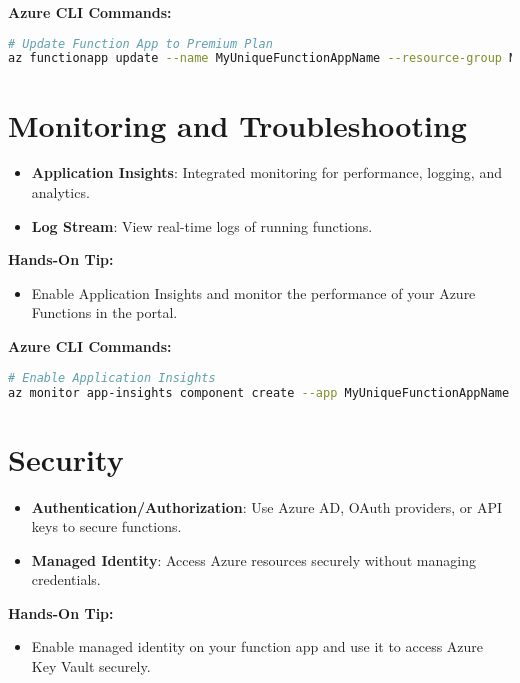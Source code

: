 \documentclass{article}
\begin{document}
\textbf{Azure CLI Commands:}
\begin{lstlisting}[language=bash]
# Update Function App to Premium Plan
az functionapp update --name MyUniqueFunctionAppName --resource-group MyResourceGroup --plan MyPremiumPlan
\end{lstlisting}

\section{Monitoring and Troubleshooting}
\begin{itemize}
    \item \textbf{Application Insights}: Integrated monitoring for performance, logging, and analytics.
    \item \textbf{Log Stream}: View real-time logs of running functions.
\end{itemize}

\textbf{Hands-On Tip:}
\begin{itemize}
    \item Enable Application Insights and monitor the performance of your Azure Functions in the portal.
\end{itemize}

\textbf{Azure CLI Commands:}
\begin{lstlisting}[language=bash]
# Enable Application Insights
az monitor app-insights component create --app MyUniqueFunctionAppName --location eastus --resource-group MyResourceGroup
\end{lstlisting}

\section{Security}
\begin{itemize}
    \item \textbf{Authentication/Authorization}: Use Azure AD, OAuth providers, or API keys to secure functions.
    \item \textbf{Managed Identity}: Access Azure resources securely without managing credentials.
\end{itemize}

\textbf{Hands-On Tip:}
\begin{itemize}
    \item Enable managed identity on your function app and use it to access Azure Key Vault securely.
\end{itemize}
\end{document}
